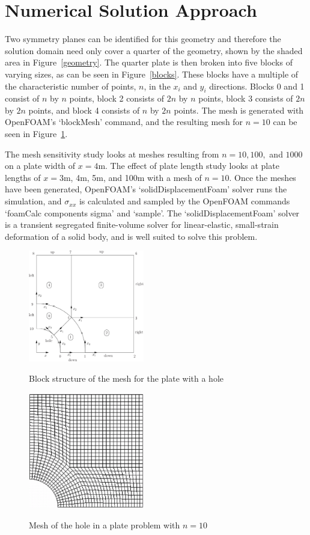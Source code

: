 \documentclass[twocolumn,10pt]{asme2ej}
\begin{document}
\section{Numerical Solution Approach}
 Two symmetry planes can be identified for this geometry and therefore the solution domain need only cover a quarter of the geometry, shown by the shaded area in Figure~\ref{geometry}. The quarter plate is then broken into five blocks of varying sizes, as can be seen in Figure~\ref{blocks}. These blocks have a multiple of the characteristic number of points, $n$, in the $x_i$ and $y_i$ directions. Blocks 0 and 1 consist of $n$ by $n$ points, block 2 consists of $2n$ by $n$ points, block 3 consists of $2n$ by $2n$ points, and block 4 consists of $n$ by $2n$ points. The mesh is generated with OpenFOAM's `blockMesh' command, and the resulting mesh for $n = 10$ can be seen in Figure~\ref{mesh}.

 The mesh sensitivity study looks at meshes resulting from $n = 10, 100, $ and $1000$ on a plate width of $x = 4$m. The effect of plate length study looks at plate lengths of $x = 3$m, 4m, 5m, and 100m with a mesh of $n = 10$. Once the meshes have been generated, OpenFOAM's `solidDisplacementFoam' solver runs the simulation, and $\sigma_{xx}$ is calculated and sampled by the OpenFOAM commands `foamCalc components sigma' and `sample'. The `solidDisplacementFoam' solver is a transient segregated finite-volume solver for linear-elastic, small-strain deformation of a solid body, and is well suited to solve this problem.
\begin{figure}[thb]
\begin{center}
\includegraphics[width=0.45\textwidth]{figure/user149x.png}
\caption{Block structure of the mesh for the plate with a hole \cite{ctfm_1}}
\label{blocks}
\includegraphics[width=0.45\textwidth]{figure/user152x.png}
\caption{Mesh of the hole in a plate problem with $n = 10$ \cite{ctfm_1}}
\label{mesh}
\end{center}
\end{figure}
\end{document}
